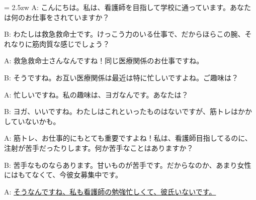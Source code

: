 \documentclass[11pt]{amsart}
\title{}
\author{}
\newenvironment{hangall}[1]{\hangindent = 2.5zw\everypar{\hangindent = 2.5zw}}{}
\begin{document}
\maketitle
\begin{hangall}{}%
A: こんにちは。私は、看護師を目指して学校に通っています。あなたは何のお仕事をされていますか？

B: わたしは救急救命士です。けっこう力のいる仕事で、だからほらこの腕、それなりに筋肉質な感じでしょう？

A: 救急救命士さんなんですね！同じ医療関係のお仕事ですね。

B: そうですね。お互い医療関係は最近は特に忙しいですよね。ご趣味は？

A: 忙しいですね。私の趣味は、ヨガなんです。あなたは？

B: ヨガ、いいですね。わたしはこれといったものはないですが、筋トレはかかしていないかも。

A: 筋トレ、お仕事的にもとても重要ですよね！私は、看護師目指してるのに、注射が苦手だったりします。何か苦手なことはありますか？

B: 苦手なものならあります。甘いものが苦手です。だからなのか、あまり女性にはもてなくて、今彼女募集中です。

A: \ul{そうなんですね、私も看護師の勉強忙しくて、彼氏いないです。}\end{hangall}
\end{document}
